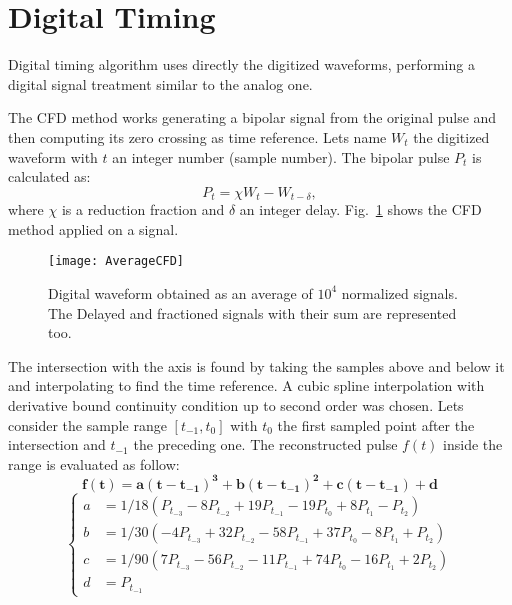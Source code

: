 \section*{Digital Timing}
Digital timing algorithm uses directly the digitized waveforms, performing a digital signal treatment similar to the analog one.
 
The CFD method works generating a bipolar signal from the original pulse and then computing its zero crossing as time reference. Lets name $W_t$ the digitized waveform with $t$ an integer number (sample number). The bipolar pulse $P_t$ is calculated as:
\begin{equation}
P_t=\chi W_t-W_{t-\delta},
\label{eq:bipolarCFD}
\end{equation}
where $\chi$ is a reduction fraction and $\delta$ an integer delay.  Fig.~\ref{Fig:DigitalCFD} shows the CFD method applied on a signal. 
\begin{figure}[h!]
	\centering
	\texttt{[image: AverageCFD]}
	\caption{Digital waveform obtained as an average of $10^4$ normalized signals. The Delayed and fractioned signals with their sum are represented too. }
	\label{Fig:DigitalCFD}
\end{figure}

\newpage
The intersection with the axis is found by taking the samples above and below  it  and interpolating to find the time reference. 
A cubic spline interpolation with derivative bound continuity condition up to second order was chosen.
Lets consider the sample range $[t_{-1},t_{0}]$ with $t_{0}$ the first sampled point after the intersection and $t_{-1}$ the preceding one. The reconstructed pulse $f(t)$ inside the range is evaluated as follow:\\
\[\mathbf{f(t)=a (t-t_{-1})^3+b (t-t_{-1})^2+c (t-t_{-1})+d}\]
\[
\left\{
\begin{aligned}
a &=1/18 (P_{t_{-3}}-8 P_{t_{-2}}+19 P_{t_{-1}}-19 P_{t_{0}}+8 P_{t_{1}}-P_{t_{2}})\\
b &=1/30 (-4 P_{t_{-3}}+32 P_{t_{-2}}-58 P_{t_{-1}}+37 P_{t_{0}}-8 P_{t_{1}}+ P_{t_{2}})\\
c &=1/90 (7 P_{t_{-3}}-56 P_{t_{-2}}-11 P_{t_{-1}}+74 P_{t_{0}}-16 P_{t_{1}}+2 P_{t_{2}})\\
d &=P_{t_{-1}}
\end{aligned}
\right.
\]


